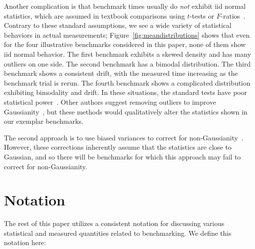 \documentclass[conference]{IEEEtran}
\begin{document}
Another complication is that benchmark times usually do \textit{not} exhibit
iid normal statistics, which are assumed in textbook comparisons using
$t$-tests or $F$-ratios~\cite{Lilja2000}.
Contrary to these standard assumptions,
we see a wide variety of statistical behaviors in actual measurements;
Figure~\ref{fig:meandistributions} shows that even for the four illustrative
benchmarks considered in this paper, none of them show iid normal behavior.
The first benchmark exhibits a skewed density and has many outliers on one side.
The second benchmark has a bimodal distribution.
The third benchmark shows a consistent drift, with the measured time increasing
as the benchmark trial is rerun.
The fourth benchmark shows a complicated distribution exhibiting bimodality and
drift.
In these situations, the standard tests have poor statistical
power~\cite{Mytkowicz2009,Kalibera2013,Chen2015,Barrett2016}.
Other authors suggest removing outliers to improve
Gaussianity~\cite{Rehn2015}, but these methods would
qualitatively alter the statistics shown in our exemplar benchmarks.

The second approach is to use biased variances to correct for
non-Gaussianity~\cite{Mytkowicz2009}. However, these corrections
inherently assume that the statistics are close to Gaussian, and so there will be
benchmarks for which this approach may fail to correct for non-Gaussianity.

\label{sec:notation}
\section{Notation}

The rest of this paper utilizes a consistent notation for discussing various statistical and
measured quantities related to benchmarking. We define this notation here:
\end{document}

